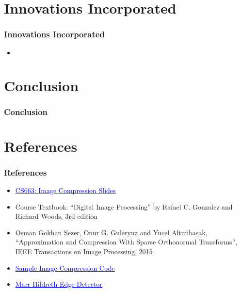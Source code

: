\documentclass[Serif, 10pt, brown]{beamer}
\theoremstyle{example}
\theoremstyle{plain}
\begin{document}
\section{Innovations Incorporated}

\begin{frame}
	\frametitle{Innovations Incorporated}
	\begin{itemize}
		\item 
	\end{itemize}
\end{frame}
\section{Conclusion}
\begin{frame}
	\frametitle{Conclusion}
\end{frame}

\section{References}

\begin{frame}
	\frametitle{References}
	\begin{itemize}
		\item \href{https://docs.google.com/presentation/d/1-8xCg7o8Vtc9ghJf6y1Nkq9-TV0qSNfX/edit?usp=sharing&ouid=115909013767952805958&rtpof=true&sd=true}{\textcolor{blue}{\underline{CS663: Image Compression Slides}}}
		\item Course Textbook: ``Digital Image Processing'' by Rafael C. Gonzalez and Richard Woods, 3rd edition
		\item Osman Gokhan Sezer, Onur G. Guleryuz and Yucel Altunbasak, ``Approximation and Compression With Sparse Orthonormal Transforms'', IEEE Transactions on Image Processing, 2015
		\item \href{https://github.com/jeremyfell/image-compression/blob/master/image-compression.py}{\textcolor{blue}{\underline{Sample Image Compression Code}}}
		\item \href{https://github.com/adl1995/edge-detectors/blob/master/marr-hildreth-edge.py}{\textcolor{blue}{\underline{Marr-Hildreth Edge Detector}}}
	\end{itemize}
\end{frame}
\end{document}
